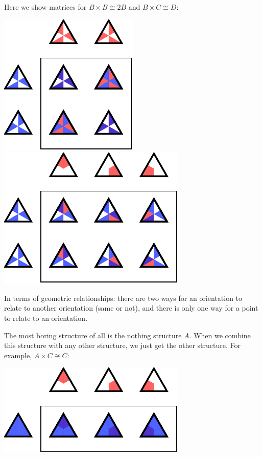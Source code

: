 \documentclass[11pt,oneside]{article}
\begin{document}
\begin{samepage}
Here we show matrices for $B\times B\cong 2B$ and 
$B\times C\cong D:$
\begin{center}
\includegraphics[]{pic-triangle-orient-orient-matrix.pdf} 
\ \ \ \ \ \ \  \ \ \ 
\includegraphics[]{pic-triangle-point-orient-matrix.pdf} 
\end{center}
\end{samepage}
In terms of geometric relationships: 
there are two ways for an orientation to relate to another
orientation (same or not), and there is only one way
for a point to relate to an orientation.

The most boring structure of all is the nothing structure $A$.
When we combine this structure with any other structure, we
just get the other structure.
For example, $A\times C\cong C:$
\begin{center}
\includegraphics[]{pic-triangle-nothing-point-matrix.pdf} 
\end{center}
\end{document}
